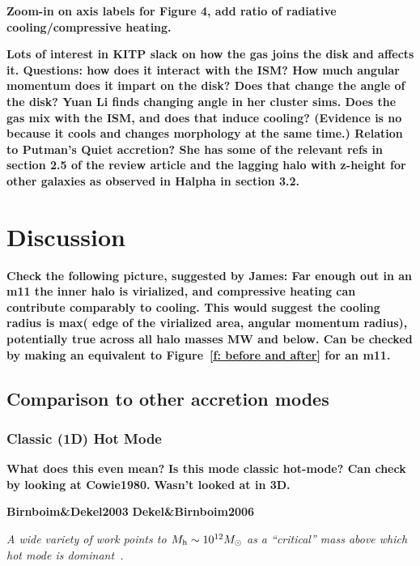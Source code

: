 \documentclass[fleqn,usenatbib]{mnras}
\begin{document}
\textbf{Zoom-in on axis labels for Figure 4, add ratio of radiative cooling/compressive heating.}

\textbf{
Lots of interest in KITP slack on how the gas joins the disk and affects it.
Questions: how does it interact with the ISM?
How much angular momentum does it impart on the disk? Does that change the angle of the disk? Yuan Li finds changing angle in her cluster sims.
Does the gas mix with the ISM, and does that induce cooling? (Evidence is no because it cools and changes morphology at the same time.)
Relation to Putman's Quiet accretion? She has some of the relevant refs in section 2.5 of the review article and the lagging halo with z-height for other galaxies as observed in Halpha in section 3.2.
}

\section{Discussion}
\label{s: discussion}

\textbf{
Check the following picture, suggested by James:
Far enough out in an m11 the inner halo is virialized, and compressive heating can contribute comparably to cooling.
This would suggest the cooling radius is max( edge of the virialized area, angular momentum radius), potentially true across all halo masses MW and below.
Can be checked by making an equivalent to Figure~\ref{f: before and after} for an m11.
}

\subsection{Comparison to other accretion modes}
\label{s: other modes}

\subsubsection{Classic (1D) Hot Mode}

\textbf{What does this even mean?}
\textbf{Is this mode classic hot-mode? Can check by looking at Cowie1980.}
\textbf{Wasn't looked at in 3D.}

\textbf{Birnboim\&Dekel2003}
\textbf{Dekel\&Birnboim2006}

\textit{
A wide variety of work points to $M_{\rm h} \sim 10^{12} M_\odot$ as a ``critical'' mass above which hot mode is dominant~\citep[e.g.][]{Correa2017}.
}
\end{document}
